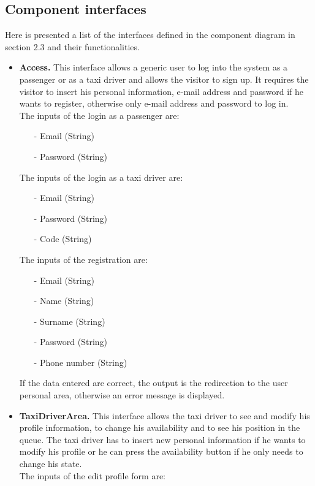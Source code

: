 	\subsection{Component interfaces}
	Here is presented a list of the interfaces defined in the component diagram in section 2.3 and their functionalities.
	\begin{itemize}
		\item \textbf{Access.}
		This interface allows a generic user to log into the system as a passenger or as a taxi driver and allows the visitor to sign up. It requires the visitor to insert his personal information, e-mail address and password if he wants to register, otherwise only e-mail address and password to log in. \\ The inputs of the login as a passenger are:
		\begin{itemize} 
			\item[-] Email (String)
			\item[-] Password (String)
		\end{itemize}
		The inputs of the login as a taxi driver are:
		\begin{itemize} 
			\item[-] Email (String)
			\item[-] Password (String)
			\item[-] Code (String)
		\end{itemize} 
		The inputs of the registration are:
		\begin{itemize} 
			\item[-] Email (String)
			\item[-] Name (String)
			\item[-] Surname (String)
			\item[-] Password (String)
			\item[-] Phone number (String)
		\end{itemize}
		If the data entered are correct, the output is the redirection to the user personal area, otherwise an error message is displayed.
		\item \textbf{TaxiDriverArea.}
		This interface allows the taxi driver to see and modify his profile information, to change his availability and to see his position in the queue. The taxi driver has to insert new personal information if he wants to modify his profile or he can  press the availability button if he only needs to change his state.\\ The inputs of the edit profile form are:

\end{itemize}
